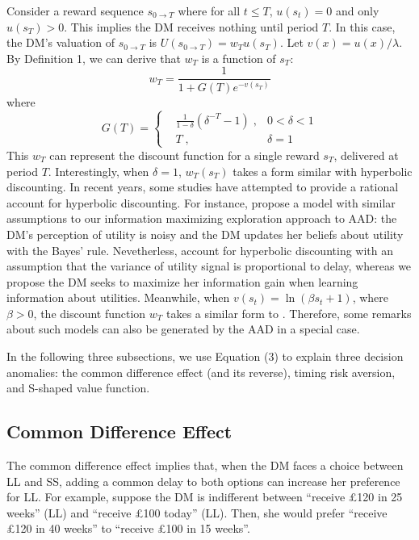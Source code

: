 \documentclass[
  12pt,
]{article}
\begin{document}
Consider a reward sequence \(s_{0\rightarrow T}\) where for all
\(t\leq T\), \(u(s_t)=0\) and only \(u(s_T)>0\). This implies the DM
receives nothing until period \(T\). In this case, the DM's valuation of
\(s_{0\rightarrow T}\) is \(U(s_{0\rightarrow T})=w_Tu(s_T)\). Let
\(v(x)=u(x)/\lambda\). By Definition 1, we can derive that \(w_T\) is a
function of \(s_T\):\[\tag{3}
 w_T = \frac{1}{1+G(T)e^{-v(s_T)}}
\]where\[ G(T) = \left\{ \begin{aligned} & \frac{1}{1-\delta}(\delta^{-T}-1) \; ,& 0<\delta<1\\ & T\; ,& \delta=1\ \end{aligned} \right. \]This
\(w_T\) can represent the discount function for a single reward \(s_T\),
delivered at period \(T\). Interestingly, when \(\delta=1\),
\(w_T(s_T)\) takes a form similar with hyperbolic discounting. In recent
years, some studies have attempted to provide a rational account for
hyperbolic discounting. For instance, \citet{gabaix2017myopia} propose a
model with similar assumptions to our information maximizing exploration
approach to AAD: the DM's perception of utility is noisy and the DM
updates her beliefs about utility with the Bayes' rule. Nevetherless,
\citet{gabaix2017myopia} account for hyperbolic discounting with an
assumption that the variance of utility signal is proportional to delay,
whereas we propose the DM seeks to maximize her information gain when
learning information about utilities. Meanwhile, when
\(v(s_t)=\ln(\beta s_t+1)\), where \(\beta>0\), the discount function
\(w_T\) takes a similar form to \citet{gershman2020rationally}.
Therefore, some remarks about such models can also be generated by the
AAD in a special case.

In the following three subsections, we use Equation (3) to explain three
decision anomalies: the common difference effect (and its reverse),
timing risk aversion, and S-shaped value function.

\hypertarget{common-difference-effect}{%
\subsection{Common Difference Effect}\label{common-difference-effect}}

The common difference effect \citep{loewenstein1992anomalies} implies
that, when the DM faces a choice between LL and SS, adding a common
delay to both options can increase her preference for LL. For example,
suppose the DM is indifferent between ``receive £120 in 25 weeks'' (LL)
and ``receive £100 today'' (LL). Then, she would prefer ``receive £120
in 40 weeks'' to ``receive £100 in 15 weeks''.
\end{document}
